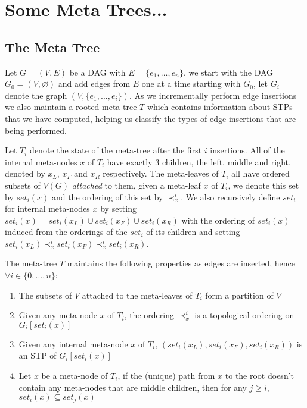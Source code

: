 \documentclass{article}
\begin{document}
\section{Some Meta Trees...}

\subsection{The Meta Tree}

Let $G=(V,E)$ be a DAG with $E=\{e_{1},...,e_{n}\}$, we start with the DAG $G_{0}=(V,\varnothing)$ and add edges from $E$ one at a time starting with $G_{0}$, let $G_{i}$ denote the graph $(V,\{e_{1},...,e_{i}\})$. As we incrementally perform edge insertions we also maintain a rooted meta-tree $T$ which contains information about STPs that we have computed, helping us classify the types of edge insertions that are being performed.

Let $T_{i}$ denote the state of the meta-tree after the first $i$ insertions. All of the internal meta-nodes $x$ of $T_{i}$ have exactly 3 children, the left, middle and right, denoted by $x_{L}$, $x_{F}$ and $x_{R}$ respectively. The meta-leaves of $T_{i}$ all have ordered subsets of $V(G)$ \textit{attached} to them, given a meta-leaf $x$ of $T_{i}$, we denote this set by $set_{i}(x)$ and the ordering of this set by $\prec_{x}^{i}$. We also recursively define $set_{i}$ for internal meta-nodes $x$ by setting $set_{i}(x) = set_{i}(x_{L}) \cup set_{i}(x_{F}) \cup set_{i}(x_{R})$ with the ordering of $set_{i}(x)$ induced from the orderings of the $set_{i}$ of its children and setting $set_{i}(x_{L}) \prec_{x}^{i} set_{i}(x_{F}) \prec_{x}^{i} set_{i}(x_{R})$.

The meta-tree $T$ maintains the following properties as edges are inserted, hence $\forall i \in \{0,...,n\}$:

\begin{enumerate}
\item The subsets of $V$ attached to the meta-leaves of $T_{i}$ form a partition of $V$
\item Given any meta-node $x$ of $T_{i}$, the ordering $\prec_{x}^{i}$ is a topological ordering on $G_{i}[set_{i}(x)]$
\item Given any internal meta-node $x$ of $T_{i}$, $(set_{i}(x_{L}), set_{i}(x_{F}), set_{i}(x_{R}))$ is an STP of $G_{i}[set_{i}(x)]$
\item Let $x$ be a meta-node of $T_{i}$, if the (unique) path from $x$ to the root doesn't contain any meta-nodes that are middle children, then for any $j\geq i$, $set_{i}(x) \subseteq set_{j}(x)$
\end{enumerate}
\end{document}
